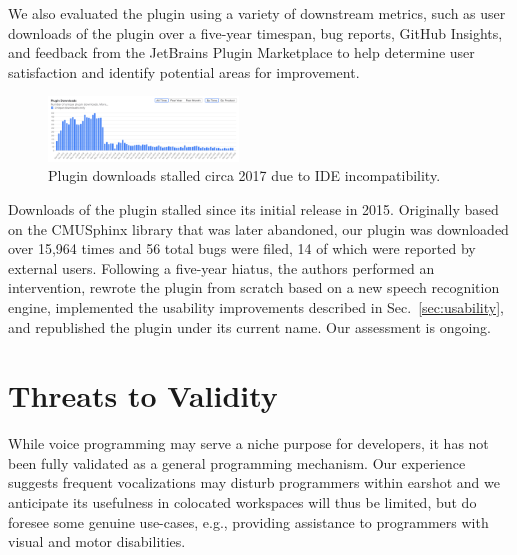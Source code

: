 \documentclass[conference]{IEEEtran}
\begin{document}
We also evaluated the plugin using a variety of downstream metrics, such as user downloads of the plugin over a five-year timespan, bug reports, GitHub Insights, and feedback from the JetBrains Plugin Marketplace to help determine user satisfaction and identify potential areas for improvement.

\begin{figure}[ht!]
    \centering
    \includegraphics[width=0.45\textwidth]{downloads.png}
    \caption{Plugin downloads stalled circa 2017 due to IDE incompatibility.}
\end{figure}

Downloads of the plugin stalled since its initial release in 2015. Originally based on the CMUSphinx library that was later abandoned, our plugin was downloaded over 15,964 times and 56 total bugs were filed, 14 of which were reported by external users. Following a five-year hiatus, the authors performed an intervention, rewrote the plugin from scratch based on a new speech recognition engine, implemented the usability improvements described in Sec.~\ref{sec:usability}, and republished the plugin under its current name. Our assessment is ongoing.



\section{Threats to Validity}

While voice programming may serve a niche purpose for developers, it has not been fully validated as a general programming mechanism. Our experience suggests frequent vocalizations may disturb programmers within earshot and we anticipate its usefulness in colocated workspaces will thus be limited, but do foresee some genuine use-cases, e.g., providing assistance to programmers with visual and motor disabilities.
\end{document}
